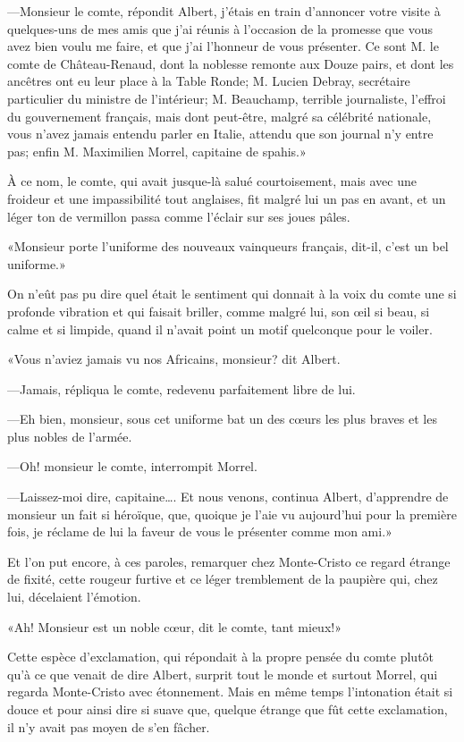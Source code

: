 —Monsieur le comte, répondit Albert, j'étais en train d'annoncer votre visite à quelques-uns de mes amis que j'ai réunis à l'occasion de la promesse que vous avez bien voulu me faire, et que j'ai l'honneur de vous présenter. Ce sont M. le comte de Château-Renaud, dont la noblesse remonte aux Douze pairs, et dont les ancêtres ont eu leur place à la Table Ronde; M. Lucien Debray, secrétaire particulier du ministre de l'intérieur; M. Beauchamp, terrible journaliste, l'effroi du gouvernement français, mais dont peut-être, malgré sa célébrité nationale, vous n'avez jamais entendu parler en Italie, attendu que son journal n'y entre pas; enfin M. Maximilien Morrel, capitaine de spahis.» 

À ce nom, le comte, qui avait jusque-là salué courtoisement, mais avec une froideur et une impassibilité tout anglaises, fit malgré lui un pas en avant, et un léger ton de vermillon passa comme l'éclair sur ses joues pâles. 

«Monsieur porte l'uniforme des nouveaux vainqueurs français, dit-il, c'est un bel uniforme.»  

On n'eût pas pu dire quel était le sentiment qui donnait à la voix du comte une si profonde vibration et qui faisait briller, comme malgré lui, son œil si beau, si calme et si limpide, quand il n'avait point un motif quelconque pour le voiler. 

«Vous n'aviez jamais vu nos Africains, monsieur? dit Albert. 

—Jamais, répliqua le comte, redevenu parfaitement libre de lui. 

—Eh bien, monsieur, sous cet uniforme bat un des cœurs les plus braves et les plus nobles de l'armée. 

—Oh! monsieur le comte, interrompit Morrel. 

—Laissez-moi dire, capitaine\dots. Et nous venons, continua Albert, d'apprendre de monsieur un fait si héroïque, que, quoique je l'aie vu aujourd'hui pour la première fois, je réclame de lui la faveur de vous le présenter comme mon ami.» 

Et l'on put encore, à ces paroles, remarquer chez Monte-Cristo ce regard étrange de fixité, cette rougeur furtive et ce léger tremblement de la paupière qui, chez lui, décelaient l'émotion. 

«Ah! Monsieur est un noble cœur, dit le comte, tant mieux!» 

Cette espèce d'exclamation, qui répondait à la propre pensée du comte plutôt qu'à ce que venait de dire Albert, surprit tout le monde et surtout Morrel, qui regarda Monte-Cristo avec étonnement. Mais en même temps l'intonation était si douce et pour ainsi dire si suave que, quelque étrange que fût cette exclamation, il n'y avait pas moyen de s'en fâcher. 

